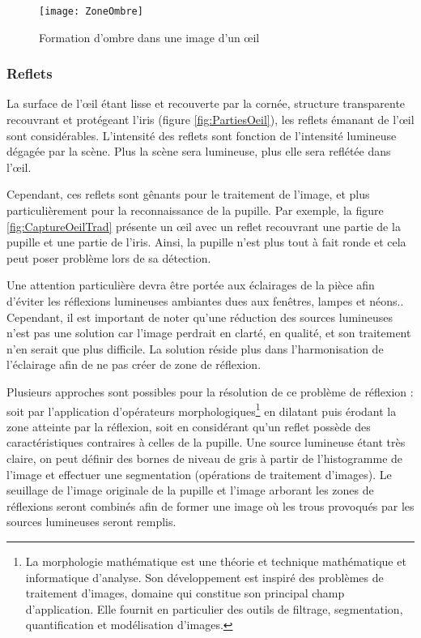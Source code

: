 \begin{figure}[h]
  \centering
  \texttt{[image: ZoneOmbre]}
  \caption{Formation d’ombre dans une image d’un œil}
  \label{fig:ZoneOmbre}
\end{figure}

\subsubsection{Reflets}

La surface de l’œil étant lisse et recouverte par la cornée, structure transparente recouvrant et protégeant l’iris (figure \ref{fig:PartiesOeil}), les reflets émanant de l’œil sont considérables. 
L’intensité des reflets sont fonction de l’intensité lumineuse dégagée par la scène. Plus la scène sera lumineuse, plus elle sera reflétée dans l’œil.

Cependant, ces reflets sont gênants pour le traitement de l’image, et plus particulièrement pour la reconnaissance de la pupille. Par exemple, la figure \ref{fig:CaptureOeilTrad} présente un œil avec un reflet recouvrant une partie de la pupille et une partie de l’iris. Ainsi, la pupille n’est plus tout à fait ronde et cela peut poser problème lors de sa détection. 

Une attention particulière devra être portée aux éclairages de la pièce afin d'éviter les réflexions lumineuses ambiantes dues aux fenêtres, lampes et néons.. Cependant, il est important de noter qu’une réduction des sources lumineuses n’est pas une solution car l’image perdrait en clarté, en qualité, et son traitement n’en serait que plus difficile. La solution réside plus dans l’harmonisation de l’éclairage afin de ne pas créer de zone de réflexion.

Plusieurs approches sont possibles pour la résolution de ce problème de réflexion : soit par l’application d’opérateurs morphologiques\footnote{La morphologie mathématique est une théorie et technique mathématique et informatique d'analyse. Son développement est inspiré des problèmes de traitement d'images, domaine qui constitue son principal champ d'application. Elle fournit en particulier des outils de filtrage, segmentation, quantification et modélisation d'images.} en dilatant puis érodant la zone atteinte par la réflexion, soit en considérant qu’un reflet possède des caractéristiques contraires à celles de la pupille. Une source lumineuse étant très claire, on peut définir des bornes de niveau de gris à partir de l’histogramme de l’image et effectuer une segmentation (opérations de traitement d’images). Le seuillage de l’image originale de la pupille et l’image arborant les zones de réflexions seront combinés afin de former une image où les trous provoqués par les sources lumineuses seront remplis.

